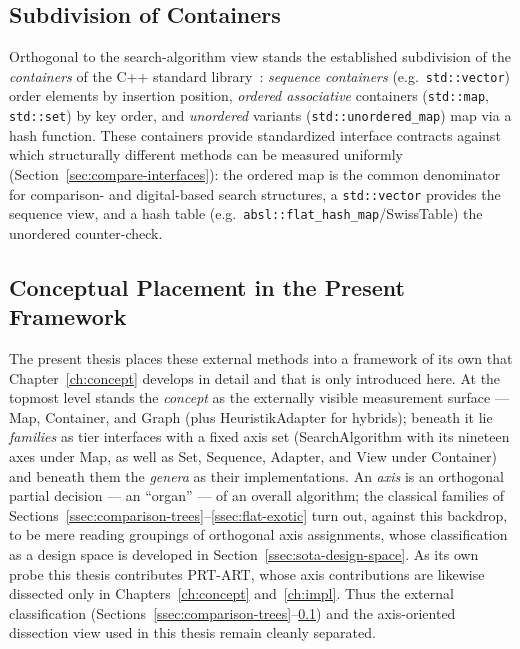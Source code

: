 \subsection{Subdivision of Containers}\label{ssec:container-taxonomy}
Orthogonal to the search-algorithm view stands the established subdivision of the \emph{containers}
of the C++ standard library~\cite{iso_cpp}: \emph{sequence containers} (e.g.\ \texttt{std::vector})
order elements by insertion position, \emph{ordered associative} containers (\texttt{std::map},
\texttt{std::set}) by key order, and \emph{unordered} variants (\texttt{std::unordered\_map}) map
via a hash function. These containers provide standardized interface contracts against which
structurally different methods can be measured uniformly (Section~\ref{sec:compare-interfaces}): the
ordered map is the common denominator for comparison- and digital-based search structures, a
\texttt{std::vector} provides the sequence view, and a hash table
(e.g.\ \texttt{absl::flat\_hash\_map}/SwissTable) the unordered counter-check.

\subsection{Conceptual Placement in the Present Framework}\label{ssec:own-framework}
The present thesis places these external methods into a framework of its own that
Chapter~\ref{ch:concept} develops in detail and that is only introduced here. At the topmost level
stands the \emph{concept} as the externally visible measurement surface --- Map, Container, and
Graph (plus HeuristikAdapter for hybrids); beneath it lie \emph{families} as tier interfaces with a
fixed axis set (SearchAlgorithm with its nineteen axes under Map, as well as Set, Sequence, Adapter,
and View under Container) and beneath them the \emph{genera} as their implementations. An \emph{axis} is an orthogonal partial decision --- an ``organ'' --- of an overall
algorithm; the classical families of Sections~\ref{ssec:comparison-trees}--\ref{ssec:flat-exotic}
turn out, against this backdrop, to be mere reading groupings of orthogonal axis assignments, whose
classification as a design space is developed in Section~\ref{ssec:sota-design-space}. As its own
probe this thesis contributes PRT-ART, whose axis contributions are likewise dissected only in
Chapters~\ref{ch:concept} and~\ref{ch:impl}. Thus the external classification
(Sections~\ref{ssec:comparison-trees}--\ref{ssec:container-taxonomy}) and the axis-oriented
dissection view used in this thesis remain cleanly separated.

